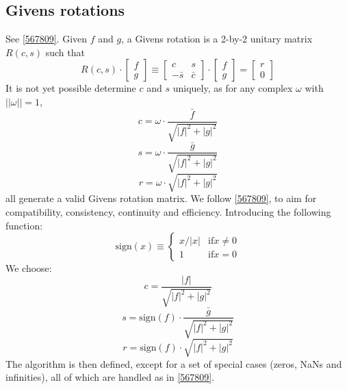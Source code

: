 \documentclass[a4paper,10pt]{article}
\begin{document}
\subsection{Givens rotations}
See \ref{567809}. Given $f$ and $g$, a Givens rotation is a 2-by-2 unitary matrix $R(c,s)$ such that
\begin{displaymath}
R(c,s)\cdot\left[\begin{array}{c}f\\g\end{array}\right] \equiv
\left[\begin{array}{cc}c & s \\ -\bar{s} & \bar{c} \end{array}\right] \cdot
\left[\begin{array}{c}f\\g\end{array}\right]=\left[\begin{array}{c}r\\0\end{array}\right]
\end{displaymath}
It is not yet possible determine $c$ and $s$ uniquely, as for any complex $\omega$ with $||\omega||=1$,
\begin{displaymath}
 c=\omega\cdot \frac{\bar{f}}{\sqrt{|f|^{2}+|g|^{2}}}
\end{displaymath}
\begin{displaymath}
 s=\omega\cdot \frac{\bar{g}}{\sqrt{|f|^{2}+|g|^{2}}}
\end{displaymath}
\begin{displaymath}
 r=\omega\cdot \sqrt{|f|^{2}+|g|^{2}}
\end{displaymath}
all generate a valid Givens rotation matrix. We follow \ref{567809}, to aim for compatibility, consistency, continuity and efficiency. Introducing the following function:
\begin{displaymath}
 \textrm{sign}(x)\equiv\left \{\begin{array}{cc}
x/|x| & \textrm{if} x \neq 0 \\
1 & \textrm{if} x = 0 \end{array} \right.
\end{displaymath}
We choose:
\begin{displaymath}
 c=\frac{|f|}{\sqrt{|f|^{2}+|g|^{2}}}
\end{displaymath}
\begin{displaymath}
 s=\textrm{sign}(f)\cdot\frac{\bar{g}}{\sqrt{|f|^{2}+|g|^{2}}}
\end{displaymath}
\begin{displaymath}
 r=\textrm{sign}(f)\cdot \sqrt{|f|^{2}+|g|^{2}}
\end{displaymath}
The algorithm is then defined, except for a set of special cases (zeros, NaNs and infinities), all of which are handled as in \ref{567809}.
\end{document}
